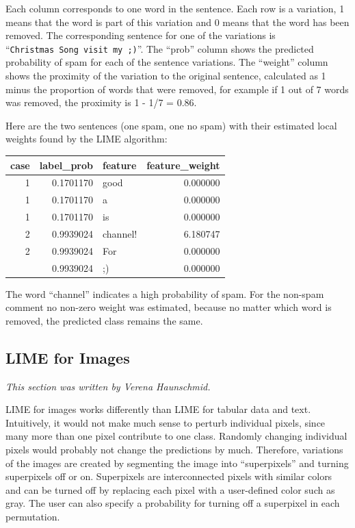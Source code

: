 \documentclass[
  10pt,
]{scrbook}
\begin{document}
Each column corresponds to one word in the sentence.
Each row is a variation, 1 means that the word is part of this variation and 0 means that the word has been removed.
The corresponding sentence for one of the variations is ``\texttt{Christmas\ Song\ visit\ my\ ;)}''.
The ``prob'' column shows the predicted probability of spam for each of the sentence variations.
The ``weight'' column shows the proximity of the variation to the original sentence, calculated as 1 minus the proportion of words that were removed, for example if 1 out of 7 words was removed, the proximity is 1 - 1/7 = 0.86.

Here are the two sentences (one spam, one no spam) with their estimated local weights found by the LIME algorithm:

\begin{table}
\centering
\begin{tabular}{rrlr}
\toprule
case & label\_prob & feature & feature\_weight\\
\midrule
1 & 0.1701170 & good & 0.000000\\
1 & 0.1701170 & a & 0.000000\\
1 & 0.1701170 & is & 0.000000\\
2 & 0.9939024 & channel! & 6.180747\\
2 & 0.9939024 & For & 0.000000\\
\addlinespace
2 & 0.9939024 & ;) & 0.000000\\
\bottomrule
\end{tabular}
\end{table}

The word ``channel'' indicates a high probability of spam.
For the non-spam comment no non-zero weight was estimated, because no matter which word is removed, the predicted class remains the same.

\hypertarget{images-lime}{%
\subsection{LIME for Images}\label{images-lime}}

\emph{This section was written by Verena Haunschmid.}

LIME for images works differently than LIME for tabular data and text.
Intuitively, it would not make much sense to perturb individual pixels, since many more than one pixel contribute to one class.
Randomly changing individual pixels would probably not change the predictions by much.
Therefore, variations of the images are created by segmenting the image into ``superpixels'' and turning superpixels off or on.
Superpixels are interconnected pixels with similar colors and can be turned off by replacing each pixel with a user-defined color such as gray.
The user can also specify a probability for turning off a superpixel in each permutation.
\end{document}
